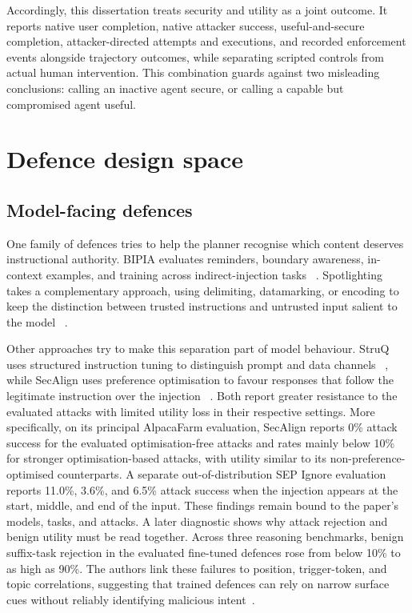 Accordingly, this dissertation treats security and utility as a joint outcome.
It reports native user completion, native attacker success, useful-and-secure
completion, attacker-directed attempts and executions, and recorded
enforcement events alongside trajectory outcomes, while separating scripted
controls from actual human intervention. This combination guards against two
misleading conclusions: calling an inactive agent secure, or calling a capable
but compromised agent useful.

\section{Defence design space}

\subsection{Model-facing defences}

One family of defences tries to help the planner recognise which content
deserves instructional authority. BIPIA evaluates reminders, boundary
awareness, in-context examples, and training across indirect-injection tasks
~\cite{yi2025bipia}. Spotlighting takes a complementary approach, using
delimiting, datamarking, or encoding to keep the distinction between trusted
instructions and untrusted input salient to the model
~\cite{hines2024spotlighting}.

Other approaches try to make this separation part of model behaviour. StruQ
uses structured instruction tuning to distinguish prompt and data channels
~\cite{chen2025struq}, while SecAlign uses preference optimisation to favour
responses that follow the legitimate instruction over the injection
~\cite{chen2025secalign}. Both report greater resistance to the evaluated
attacks with limited utility loss in their respective settings. More
specifically, on its principal AlpacaFarm evaluation, SecAlign reports 0\%
attack success for the evaluated optimisation-free attacks and rates mainly
below 10\% for stronger optimisation-based attacks, with utility similar to its
non-preference-optimised counterparts. A separate out-of-distribution SEP
Ignore evaluation reports 11.0\%, 3.6\%, and 6.5\% attack success when the
injection appears at the start, middle, and end of the input. These findings
remain bound to the paper's models, tasks, and attacks. A later diagnostic shows
why attack rejection and benign utility must be read together. Across three
reasoning benchmarks, benign suffix-task rejection in the evaluated fine-tuned
defences rose from below 10\% to as high as 90\%. The authors link these
failures to position, trigger-token, and topic correlations, suggesting that
trained defences can rely on narrow surface cues without reliably identifying
malicious intent~\cite{li2026surfaceheuristics}.

